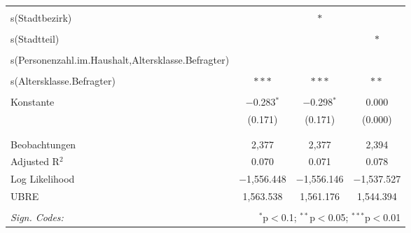 \documentclass{Vorlage}
\begin{document}
\begin{appendix}
\begin{table}[!htbp]
\begin{tabular}{@{\extracolsep{5pt}}lccc}
  & & & \\ 
 s(Stadtbezirk) &  & $*$ &  \\ 
  & & & \\ 
 s(Stadtteil) &  &  & $*$ \\ 
  & & & \\ 
 s(Personenzahl.im.Haushalt,Altersklasse.Befragter) &  &  &  \\ 
  & & & \\ 
 s(Altersklasse.Befragter) & $***$ & $***$ & $**$ \\ 
  & & & \\ 
 Konstante & $-$0.283$^{*}$ & $-$0.298$^{*}$ & 0.000 \\ 
  & (0.171) & (0.171) & (0.000) \\ 
  & & & \\ 
\hline \\[-1.8ex] 
Beobachtungen & 2,377 & 2,377 & 2,394 \\ 
Adjusted R$^{2}$ & 0.070 & 0.071 & 0.078 \\ 
Log Likelihood & $-$1,556.448 & $-$1,556.146 & $-$1,537.527 \\ 
UBRE & 1,563.538 & 1,561.176 & 1,544.394 \\ 
\hline 
\hline \\[-1.8ex] 
\textit{Sign. Codes:}  & \multicolumn{3}{r}{$^{*}$p$<$0.1; $^{**}$p$<$0.05; $^{***}$p$<$0.01} \\ 
\end{tabular} 
\end{table} 



\end{appendix}
\end{document}
